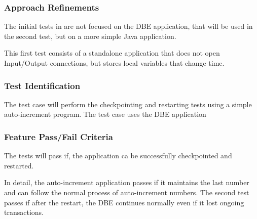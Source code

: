 \subsubsection{Approach Refinements}
The initial tests in  are not focused on the DBE 
application, that will be used in the second test, but on a more simple 
Java application.

This first test consists of a standalone application that does not open 
Input/Output connections, but stores local variables that change 
time.


\subsubsection{Test Identification}
The test case  will perform the checkpointing and
restarting tests using a simple auto-increment program. The test case 
 uses the DBE application


\subsubsection{Feature Pass/Fail Criteria}
The tests will pass if, the application ca be successfully checkpointed and restarted.

In detail, the auto-increment application passes if it maintains the last
number and can follow the normal process of auto-increment numbers. The second
test passes if after the restart, the DBE continues normally even if 
it lost ongoing transactions.


